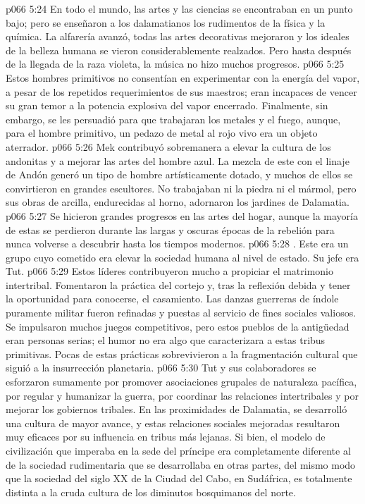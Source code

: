 \vs p066 5:24 En todo el mundo, las artes y las ciencias se encontraban en un punto bajo; pero se enseñaron a los dalamatianos los rudimentos de la física y la química. La alfarería avanzó, todas las artes decorativas mejoraron y los ideales de la belleza humana se vieron considerablemente realzados. Pero hasta después de la llegada de la raza violeta, la música no hizo muchos progresos.
\vs p066 5:25 Estos hombres primitivos no consentían en experimentar con la energía del vapor, a pesar de los repetidos requerimientos de sus maestros; eran incapaces de vencer su gran temor a la potencia explosiva del vapor encerrado. Finalmente, sin embargo, se les persuadió para que trabajaran los metales y el fuego, aunque, para el hombre primitivo, un pedazo de metal al rojo vivo era un objeto aterrador.
\vs p066 5:26 Mek contribuyó sobremanera a elevar la cultura de los andonitas y a mejorar las artes del hombre azul. La mezcla de este con el linaje de Andón generó un tipo de hombre artísticamente dotado, y muchos de ellos se convirtieron en grandes escultores. No trabajaban ni la piedra ni el mármol, pero sus obras de arcilla, endurecidas al horno, adornaron los jardines de Dalamatia.
\vs p066 5:27 Se hicieron grandes progresos en las artes del hogar, aunque la mayoría de estas se perdieron durante las largas y oscuras épocas de la rebelión para nunca volverse a descubrir hasta los tiempos modernos.
\vs p066 5:28 . Este era un grupo cuyo cometido era elevar la sociedad humana al nivel de estado. Su jefe era Tut.
\vs p066 5:29 Estos líderes contribuyeron mucho a propiciar el matrimonio intertribal. Fomentaron la práctica del cortejo y, tras la reflexión debida y tener la oportunidad para conocerse, el casamiento. Las danzas guerreras de índole puramente militar fueron refinadas y puestas al servicio de fines sociales valiosos. Se impulsaron muchos juegos competitivos, pero estos pueblos de la antigüedad eran personas serias; el humor no era algo que caracterizara a estas tribus primitivas. Pocas de estas prácticas sobrevivieron a la fragmentación cultural que siguió a la insurrección planetaria.
\vs p066 5:30 Tut y sus colaboradores se esforzaron sumamente por promover asociaciones grupales de naturaleza pacífica, por regular y humanizar la guerra, por coordinar las relaciones intertribales y por mejorar los gobiernos tribales. En las proximidades de Dalamatia, se desarrolló una cultura de mayor avance, y estas relaciones sociales mejoradas resultaron muy eficaces por su influencia en tribus más lejanas. Si bien, el modelo de civilización que imperaba en la sede del príncipe era completamente diferente al de la sociedad rudimentaria que se desarrollaba en otras partes, del mismo modo que la sociedad del siglo XX de la Ciudad del Cabo, en Sudáfrica, es totalmente distinta a la cruda cultura de los diminutos bosquimanos del norte.
